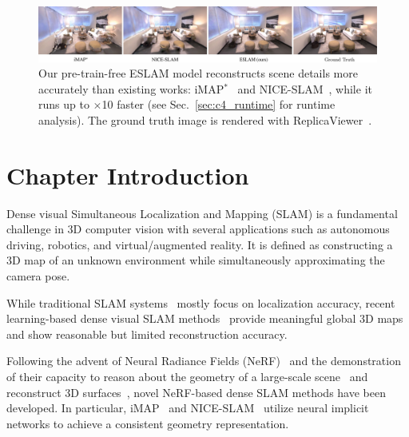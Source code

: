 \begin{figure}[t]
    \begin{center}
        \includegraphics[width=1.0\linewidth]{images/chapter4/figures/Fig1.jpg}
    \end{center}
   \caption{Our pre-train-free ESLAM model reconstructs scene details more accurately than existing works: iMAP$^*$~\cite{sucar2021imap} and NICE-SLAM~\cite{zhu2022nice}, while it runs up to $\times$10 faster (see Sec.~\ref{sec:c4_runtime} for runtime analysis). The ground truth image is rendered with ReplicaViewer~\cite{replica19arxiv}.}
\end{figure}

\section{Chapter Introduction}

Dense visual Simultaneous Localization and Mapping (SLAM) is a fundamental challenge in 3D computer vision with several applications such as autonomous driving, robotics, and virtual/augmented reality. It is defined as constructing a 3D map of an unknown environment while simultaneously approximating the camera pose.

While traditional SLAM systems~\cite{mur2017orb, engel2014lsd, newcombe2011dtam, schops2019bad, whelan2015elasticfusion, whelan2012kintinuous} mostly focus on localization accuracy, recent learning-based dense visual SLAM methods~\cite{bloesch2018codeslam, yang2022fd, czarnowski2020deepfactors, sucar2020nodeslam, zhi2019scenecode, teed2021droid, mccormac2017semanticfusion, sunderhauf2017meaningful, tang2018ba, koestler2022tandem} provide meaningful global 3D maps and show reasonable but limited reconstruction accuracy.

Following the advent of Neural Radiance Fields (NeRF)~\cite{mildenhall2020nerf} and the demonstration of their capacity to reason about the geometry of a large-scale scene~\cite{deng2022depth, kosiorek2021nerf, chen2021mvsnerf, johari2022geonerf, wei2021nerfingmvs, jain2021putting, wu2022scalable} and reconstruct 3D surfaces~\cite{yariv2021volume, azinovic2022neural, wang2021neus, sun2022neural, or2022stylesdf, li2022bnv, ortiz2022isdf, zhang2021ners, wang2022neuris}, novel NeRF-based dense SLAM methods have been developed. In particular, iMAP~\cite{sucar2021imap} and NICE-SLAM~\cite{zhu2022nice} utilize neural implicit networks to achieve a consistent geometry representation.

